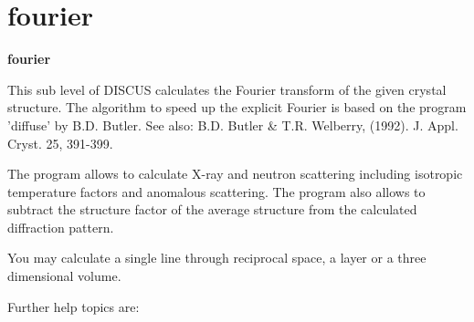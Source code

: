 \section{fourier}
{\bf fourier \par }
\par
\vspace{3pt}
This sub level of DISCUS calculates the Fourier transform of the given 
crystal structure. The algorithm to speed up the explicit Fourier is 
based on the program 'diffuse' by B.D. Butler. See also: B.D. Butler \& 
T.R. Welberry, (1992).  J. Appl. Cryst. 25, 391-399. 
\par
The program allows to calculate X-ray and neutron scattering including 
isotropic temperature factors and anomalous scattering. The program 
also allows to subtract the structure factor of the average structure 
from the calculated diffraction pattern. 
\par
You may calculate a single line through reciprocal space, a layer 
or a three dimensional volume. 
\par
Further help topics are: 
\par
